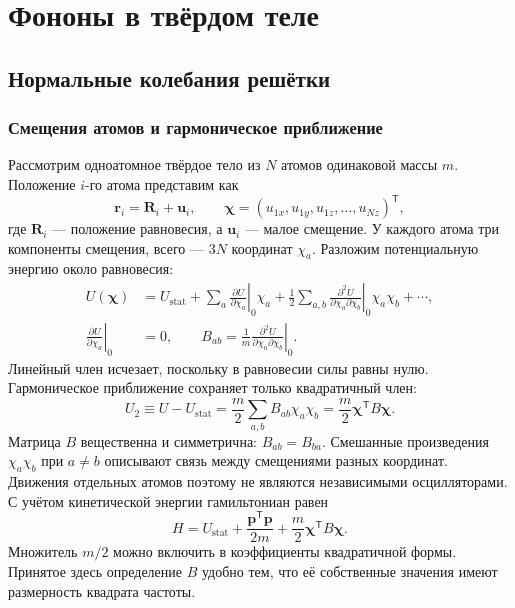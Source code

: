 \documentclass[../final.tex]{subfiles}
\begin{document}
\ifSubfilesClassLoaded{\setcounter{chapter}{5}}{}

\chapter{Фононы в твёрдом теле}

\section{Нормальные колебания решётки}
\subsection{Смещения атомов и гармоническое приближение}
Рассмотрим одноатомное твёрдое тело из $N$ атомов одинаковой массы $m$.
Положение $i$-го атома представим как
\begin{equation*}
 \mathbf r_i=\mathbf R_i+\mathbf u_i,
 \qquad\boldsymbol\chi=(u_{1x},u_{1y},u_{1z},\ldots,u_{Nz})^{\mathsf T},
\end{equation*}
где $\mathbf R_i$ --- положение равновесия, а $\mathbf u_i$ --- малое смещение.
У каждого атома три компоненты смещения, всего --- $3N$ координат $\chi_a$.
Разложим потенциальную энергию около равновесия:
\begin{align*}
 U(\boldsymbol\chi)&=U_{\mathrm{stat}}
 +\sum_a\left.\frac{\partial U}{\partial\chi_a}\right|_0\chi_a
 +\frac12\sum_{a,b}\left.\frac{\partial^2U}
 {\partial\chi_a\partial\chi_b}\right|_0\chi_a\chi_b+\cdots,\\
 \left.\frac{\partial U}{\partial\chi_a}\right|_0&=0,\qquad
 B_{ab}=\frac1m\left.\frac{\partial^2U}
 {\partial\chi_a\partial\chi_b}\right|_0.
\end{align*}
Линейный член исчезает, поскольку в равновесии силы равны нулю.
Гармоническое приближение сохраняет только квадратичный член:
\begin{equation*}
 U_2\equiv U-U_{\mathrm{stat}}
 =\frac m2\sum_{a,b}B_{ab}\chi_a\chi_b
 =\frac m2\boldsymbol\chi^{\mathsf T}B\boldsymbol\chi.
\end{equation*}
Матрица $B$ вещественна и симметрична: $B_{ab}=B_{ba}$.
Смешанные произведения $\chi_a\chi_b$ при $a\ne b$ описывают связь
между смещениями разных координат. Движения отдельных атомов поэтому
не являются независимыми осцилляторами.
С учётом кинетической энергии гамильтониан равен
\begin{equation*}
 H=U_{\mathrm{stat}}+\frac{\mathbf p^{\mathsf T}\mathbf p}{2m}
 +\frac m2\boldsymbol\chi^{\mathsf T}B\boldsymbol\chi.
\end{equation*}
Множитель $m/2$ можно включить в коэффициенты квадратичной формы.
Принятое здесь определение $B$ удобно тем, что её собственные значения
имеют размерность квадрата частоты.
\end{document}
